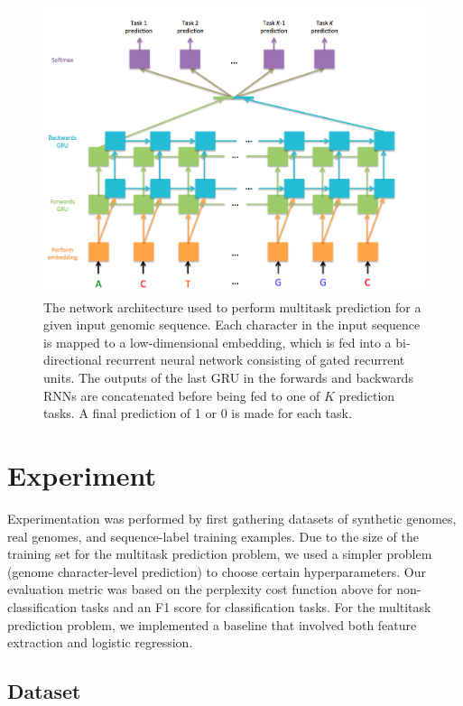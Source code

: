 \documentclass{article} %
\begin{document}
\begin{figure}[!htb]
	\centering
	\includegraphics[scale=0.4]{Figure1}
	\caption{The network architecture used to perform multitask prediction for a given input genomic sequence. Each character in the input sequence is mapped to a low-dimensional embedding, which is fed into a bi-directional recurrent neural network consisting of gated recurrent units. The outputs of the last GRU in the forwards and backwards RNNs are concatenated before being fed to one of $K$ prediction tasks. A final prediction of 1 or 0 is made for each task.}
\end{figure}

\section{Experiment}

Experimentation was performed by first gathering datasets of synthetic genomes, real genomes, and sequence-label training examples. Due to the size of the training set for the multitask prediction problem, we used a simpler problem (genome character-level prediction) to choose certain hyperparameters. Our evaluation metric was based on the perplexity cost function above for non-classification tasks and an F1 score for classification tasks. For the multitask prediction problem, we implemented a baseline that involved both feature extraction and logistic regression.

\subsection{Dataset}
\end{document}
